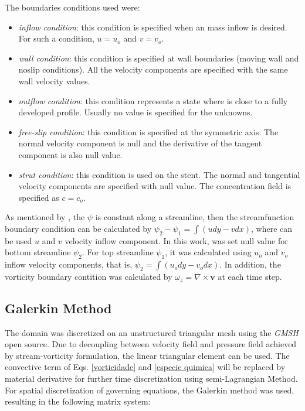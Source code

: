 \documentclass[10pt,fleqn,a4paper,twoside]{article}
\begin{document}
\bigskip
\noindent
The boundaries conditions used were:

\begin{itemize}
 \item \textit{inflow condition}:
 this condition is specified when an mass inflow is desired.
 For such a condition, $u = u_{o}$
 and $v = v_{o}$.

 \item \textit{wall condition}:
 this condition is specified at wall boundaries (moving wall
 and noslip conditions).
 All the velocity components are specified with 
 the same wall velocity values.

 \item \textit{outflow condition}: 
 this condition represents a state where is close to a
 fully developed profile.
 Usually no value is specified for the unknowns.

 \item \textit{free-slip condition}: 
 this condition is specified at the symmetric axis.
 The normal velocity component is null and the derivative of
 the tangent component is also null value.

 \item \textit{strut condition}: 
 this condition is used on the stent. The normal and tangential
 velocity components are specified with null value. 
 The concentration field is specified as $c=c_{o}$.
\end{itemize}

As mentioned by \cite{batchelor1967},
the $\psi$ is constant along a streamline, then
the streamfunction boundary condition can be calculated by
$\psi_{2} - \psi_{1} = \int \left(udy - vdx\right)$,
where can be used $u$ and $v$ velocity inflow component.
In this work, was set
null value for bottom streamline $\psi_{2}$. For top streamline $\psi_{1}$,
it was calculated using $u_{o}$ and $v_{o}$ inflow velocity
components, that is, $\psi_{2} = \int \left(u_{o}dy - v_{o}dx\right)$.
In addition, the vorticity boundary contition
was calculated by $\omega_{z} = \nabla \times \textbf{v}$
at each time step.



\subsection{Galerkin Method}
The domain was discretized on an unstructured triangular mesh using the \textit{GMSH} open source. Due to decoupling between velocity field and pressure field achieved by stream-vorticity formulation, the linear triangular element can be used.
The convective term of Eqs. \ref{vorticidade}  and \ref{especie quimica} 
will be replaced by material derivative for further time discretization
using semi-Lagrangian Method. For spatial discretization of governing equations, 
the Galerkin method was used, 
resulting in the following matrix system:
\end{document}
